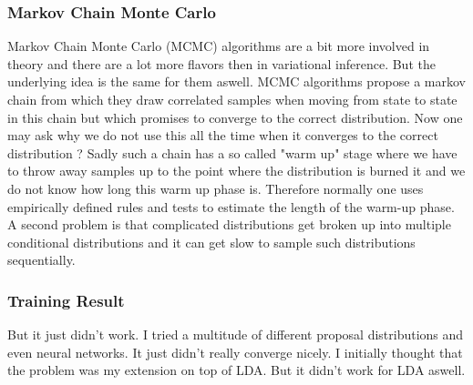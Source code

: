 \documentclass[10pt,conference,compsocconf]{IEEEtran}
\begin{document}
\subsubsection{Markov Chain Monte Carlo}
Markov Chain Monte Carlo (MCMC) algorithms are a bit more involved in theory and there are a lot more flavors then in variational inference. But the underlying idea is the same for them aswell. MCMC algorithms propose a markov chain from which they draw correlated samples when moving from state to state in this chain but which promises to converge to the correct distribution. Now one may ask why we do not use this all the time when it converges to the correct distribution ? Sadly such a chain has a so called "warm up" stage where we have to throw away samples up to the point where the distribution is burned it and we do not know how long this warm up phase is. Therefore normally one uses empirically defined rules and tests to estimate the length of the warm-up phase. A second problem is that complicated distributions get broken up into multiple conditional distributions and it can get slow to sample such distributions sequentially. \\



\subsubsection{Training Result}

But it just didn't work. I tried a multitude of different proposal distributions and even neural networks. It just didn't really converge nicely. I initially thought that the problem was my extension on top of LDA. But it didn't work for LDA aswell. 
\end{document}
